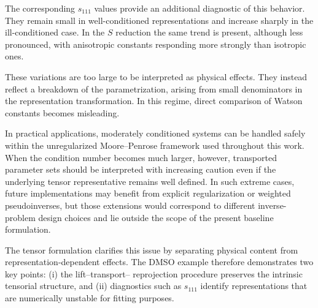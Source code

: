 \documentclass[aip,jcp,reprint,floatfix]{revtex4-2}
\begin{document}
The corresponding $s_{111}$ values provide an additional diagnostic of this
behavior. They remain small in well-conditioned representations and
increase sharply in the ill-conditioned case. In the $S$ reduction the
same trend is present, although less pronounced, with anisotropic
constants responding more strongly than isotropic ones.

These variations are too large to be interpreted as physical effects.
They instead reflect a breakdown of the parametrization, arising from
small denominators in the representation transformation. In this
regime, direct comparison of Watson constants becomes misleading.

In practical applications, moderately conditioned systems can be
handled safely within the unregularized Moore--Penrose framework used
throughout this work. When the condition number becomes much larger,
however, transported parameter sets should be interpreted with
increasing caution even if the underlying tensor representative
remains well defined. In such extreme cases, future implementations
may benefit from explicit regularization or weighted pseudoinverses,
but those extensions would correspond to different inverse-problem
design choices and lie outside the scope of the present baseline
formulation.

The tensor formulation clarifies this issue by separating physical
content from representation-dependent effects. The DMSO example
therefore demonstrates two key points: (i) the lift--transport--
reprojection procedure preserves the intrinsic tensorial structure,
and (ii) diagnostics such as $s_{111}$ identify representations that
are numerically unstable for fitting purposes.
\end{document}
